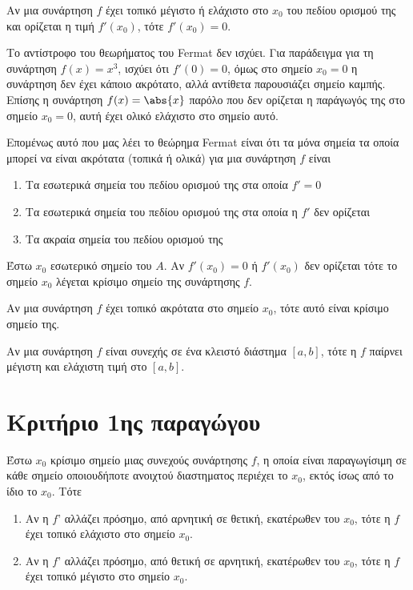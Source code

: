 \begin{thm}[Fermat]
  Αν μια συνάρτηση $f$ έχει τοπικό μέγιστο ή ελάχιστο στο $ x_{0} $ του
  πεδίου ορισμού της και ορίζεται η τιμή $ f'(x_{0}) $, τότε $ f'(x_{0}) = 0 $.
\end{thm}

\begin{rem}
  Το αντίστροφο του θεωρήματος του Fermat δεν ισχύει. Για παράδειγμα για τη συνάρτηση
  $ f(x)=x^{3} $, ισχύει ότι $ f'(0)=0 $, όμως στο σημείο $ x_{0} = 0 $ η συνάρτηση 
  δεν έχει κάποιο ακρότατο, αλλά αντίθετα παρουσιάζει σημείο καμπής. Επίσης η συνάρτηση 
  $ f(x) = \abs{x} $ παρόλο που δεν ορίζεται η παράγωγός της στο σημείο $ x_{0} = 0 $, 
  αυτή έχει ολικό ελάχιστο στο σημείο αυτό.
\end{rem}

\begin{rem}
  Επομένως αυτό που μας λέει το θεώρημα Fermat είναι ότι τα μόνα σημεία τα οποία
  μπορεί να είναι ακρότατα (τοπικά ή ολικά) για μια συνάρτηση $f$ είναι 

  \begin{enumerate}
    \item Τα εσωτερικά σημεία του πεδίου ορισμού της στα οποία $ f'=0 $
    \item Τα εσωτερικά σημεία του πεδίου ορισμού της στα οποία η $ f' $ δεν ορίζεται
    \item Τα ακραία σημεία του πεδίου ορισμού της
  \end{enumerate}
\end{rem}

\begin{dfn}
  Έστω $ x_{0} $ εσωτερικό σημείο του $A$. Αν $ f'(x_{0}) = 0 $ ή $ f'(x_{0}) $ 
  δεν ορίζεται τότε το σημείο $ x_{0} $ λέγεται \textcolor{Col1}{κρίσιμο} σημείο της 
  συνάρτησης $f$. 
\end{dfn}

\begin{prop}
  Αν μια συνάρτηση $f$ έχει τοπικό ακρότατα στο σημείο $ x_{0} $, τότε αυτό είναι κρίσιμο
  σημείο της.
\end{prop}

\begin{thm}
  Αν μια συνάρτηση $f$ είναι συνεχής σε ένα κλειστό διάστημα $ [a,b] $, τότε η $f$
  παίρνει μέγιστη και ελάχιστη τιμή στο $ [a,b] $.
\end{thm}

\section*{Κριτήριο 1ης παραγώγου}
Έστω $ x_{0} $ κρίσιμο σημείο μιας συνεχούς συνάρτησης $f$, η οποία είναι 
παραγωγίσιμη σε κάθε σημείο οποιουδήποτε ανοιχτού διαστηματος περιέχει το $ x_{0} $, 
εκτός ίσως από το ίδιο το $ x_{0} $. Τότε
\begin{enumerate}
  \item Αν η $f$' αλλάζει πρόσημο, από αρνητική σε θετική, εκατέρωθεν του $ x_{0} $, 
    τότε η $f$ έχει τοπικό ελάχιστο στο σημείο $ x_{0} $.
  \item Αν η $f$' αλλάζει πρόσημο, από θετική σε αρνητική, εκατέρωθεν του $ x_{0} $, 
    τότε η $f$ έχει τοπικό μέγιστο στο σημείο $ x_{0} $.
\end{enumerate}

